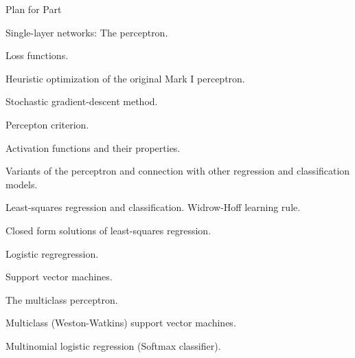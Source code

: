 \begin{frame}{Plan for Part \thispart}

\begin{itemize}
{\small
\item Single-layer networks: The perceptron.
\item Loss functions.
\item Heuristic optimization of the original Mark I perceptron.
\item Stochastic gradient-descent method.
\item Percepton criterion.
\item Activation functions and their properties.
\item Variants of the perceptron and connection with other regression and classification models.
    \begin{itemize}
    {\small
        \item Least-squares regression and classification. Widrow-Hoff learning rule.
        \item Closed form solutions of least-squares regression.
        \item Logistic regregression.
        \item Support vector machines.
    }
    \end{itemize}
\item The multiclass perceptron.
\item Multiclass (Weston-Watkins) support vector machines.
\item Multinomial logistic regression (Softmax classifier).
}
\end{itemize}

\end{frame}
